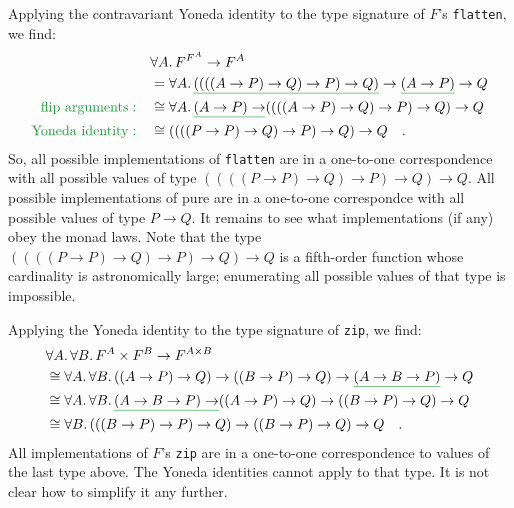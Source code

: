 Applying the contravariant Yoneda identity to the type signature of
$F$\textsf{'}s \lstinline!flatten!, we find: 
\begin{align*}
 & \forall A.\,F^{F^{A}}\rightarrow F^{A}\\
 & =\forall A.\,\gunderline{((((A\rightarrow P)\rightarrow Q)\rightarrow P)\rightarrow Q)}\rightarrow\gunderline{(A\rightarrow P)}\rightarrow Q\\
{\color{greenunder}\text{flip arguments}:}\quad & \cong\forall A.\,\gunderline{(A\rightarrow P)\rightarrow}((((A\rightarrow P)\rightarrow Q)\rightarrow P)\rightarrow Q)\rightarrow Q\\
{\color{greenunder}\text{Yoneda identity}:}\quad & \cong((((P\rightarrow P)\rightarrow Q)\rightarrow P)\rightarrow Q)\rightarrow Q\quad.
\end{align*}
So, all possible implementations of \lstinline!flatten! are in a
one-to-one correspondence with all possible values of type $((((P\rightarrow P)\rightarrow Q)\rightarrow P)\rightarrow Q)\rightarrow Q$.
All possible implementations of pure are in a one-to-one correspondce
with all possible values of type $P\rightarrow Q$. It remains to
see what implementations (if any) obey the monad laws. Note that the
type $((((P\rightarrow P)\rightarrow Q)\rightarrow P)\rightarrow Q)\rightarrow Q$
is a fifth-order function whose cardinality is astronomically large;
enumerating all possible values of that type is impossible.

Applying the Yoneda identity to the type signature of \lstinline!zip!,
we find:
\begin{align*}
 & \forall A.\,\forall B.\,F^{A}\times F^{B}\rightarrow F^{A\times B}\\
 & \cong\forall A.\,\forall B.\,((A\rightarrow P)\rightarrow Q)\rightarrow((B\rightarrow P)\rightarrow Q)\rightarrow\gunderline{(A\rightarrow B\rightarrow P)}\rightarrow Q\\
 & \cong\forall A.\,\forall B.\,\gunderline{(A\rightarrow B\rightarrow P)\rightarrow}((A\rightarrow P)\rightarrow Q)\rightarrow((B\rightarrow P)\rightarrow Q)\rightarrow Q\\
 & \cong\forall B.\,(((B\rightarrow P)\rightarrow P)\rightarrow Q)\rightarrow((B\rightarrow P)\rightarrow Q)\rightarrow Q\quad.
\end{align*}
All implementations of $F$\textsf{'}s \lstinline!zip! are in a one-to-one
correspondence to values of the last type above. The Yoneda identities
cannot apply to that type. It is not clear how to simplify it any
further.

